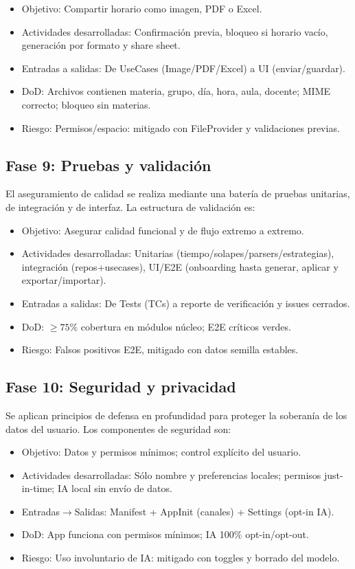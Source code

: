 \begin{itemize}
  \item Objetivo: Compartir horario como imagen, PDF o Excel.
  \item Actividades desarrolladas: Confirmación previa, bloqueo si horario vacío, generación por formato y share sheet.
  \item Entradas a salidas: De UseCases (Image/PDF/Excel) a UI (enviar/guardar).
  \item DoD: Archivos contienen materia, grupo, día, hora, aula, docente; MIME correcto; bloqueo sin materias.
  \item Riesgo: Permisos/espacio: mitigado con FileProvider y validaciones previas.
\end{itemize}

\subsection{Fase 9: Pruebas y validación}
El aseguramiento de calidad se realiza mediante una batería de pruebas unitarias, de integración y de interfaz. La estructura de validación es:

\begin{itemize}
  \item Objetivo: Asegurar calidad funcional y de flujo extremo a extremo.
  \item Actividades desarrolladas: Unitarias (tiempo/solapes/parsers/estrategias), integración (repos+usecases), UI/E2E (onboarding hasta generar, aplicar y exportar/importar).
  \item Entradas a salidas: De Tests (TCs) a reporte de verificación y issues cerrados.
  \item DoD: $\geq 75\%$ cobertura en módulos núcleo; E2E críticos verdes.
  \item Riesgo: Falsos positivos E2E, mitigado con datos semilla estables.
\end{itemize}

\subsection{Fase 10: Seguridad y privacidad}
Se aplican principios de defensa en profundidad para proteger la soberanía de los datos del usuario. Los componentes de seguridad son:

\begin{itemize}
  \item Objetivo: Datos y permisos mínimos; control explícito del usuario.
  \item Actividades desarrolladas: Sólo nombre y preferencias locales; permisos just-in-time; IA local sin envío de datos.
  \item Entradas$\rightarrow$Salidas: Manifest + AppInit (canales) + Settings (opt-in IA).
  \item DoD: App funciona con permisos mínimos; IA 100\% opt-in/opt-out.
  \item Riesgo: Uso involuntario de IA: mitigado con toggles y borrado del modelo.
\end{itemize}

